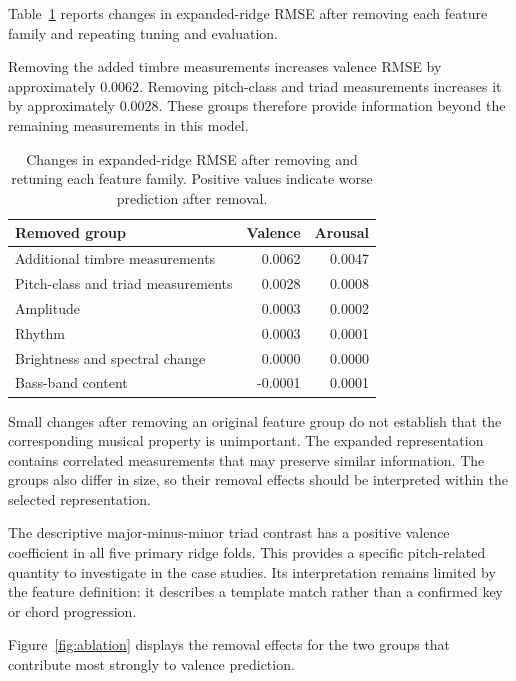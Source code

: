Table~\ref{tab:ablation} reports changes in expanded-ridge RMSE after removing each feature family and repeating tuning and evaluation.

Removing the added timbre measurements increases valence RMSE by approximately $0.0062$. Removing pitch-class and triad measurements increases it by approximately $0.0028$. These groups therefore provide information beyond the remaining measurements in this model.

\begin{table}[ht]
\centering
\caption{Changes in expanded-ridge RMSE after removing and retuning each feature family. Positive values indicate worse prediction after removal.}
\label{tab:ablation}
\begin{tabular}{lrr}
\toprule
Removed group & Valence & Arousal \\
\midrule
Additional timbre measurements & 0.0062 & 0.0047 \\
Pitch-class and triad measurements & 0.0028 & 0.0008 \\
Amplitude & 0.0003 & 0.0002 \\
Rhythm & 0.0003 & 0.0001 \\
Brightness and spectral change & 0.0000 & 0.0000 \\
Bass-band content & -0.0001 & 0.0001 \\
\bottomrule
\end{tabular}
\end{table}

Small changes after removing an original feature group do not establish that the corresponding musical property is unimportant. The expanded representation contains correlated measurements that may preserve similar information. The groups also differ in size, so their removal effects should be interpreted within the selected representation.

The descriptive major-minus-minor triad contrast has a positive valence coefficient in all five primary ridge folds. This provides a specific pitch-related quantity to investigate in the case studies. Its interpretation remains limited by the feature definition: it describes a template match rather than a confirmed key or chord progression.

Figure~\ref{fig:ablation} displays the removal effects for the two groups that contribute most strongly to valence prediction.

